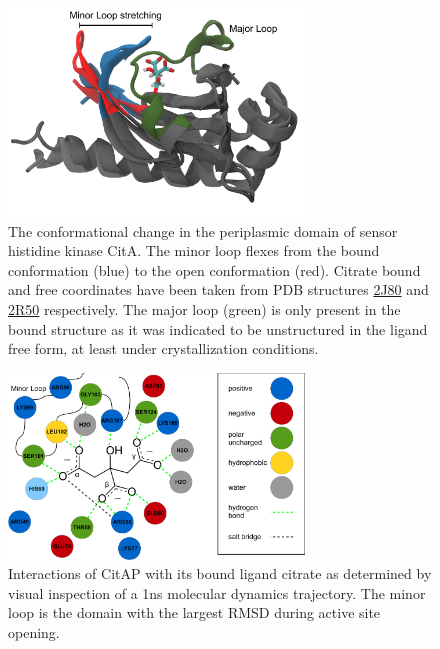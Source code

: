 \documentclass[english, a4paper, 12pt, titlepage, draft]{article}
\newcommand{\PDB}[1]{
    \href{http://pdb.rcsb.org/pdb/explore/explore.do?structureId=#1}{#1}
}
\begin{document}
\begin{figure}
    \centering
    \includegraphics[width=0.7\textwidth]{figures/CitAP_conf_change/CitAP_conf_change.pdf}
    \caption{The conformational change in the periplasmic domain of sensor histidine kinase CitA.
    The minor loop flexes from the bound conformation (blue) to the open conformation (red).
    Citrate bound and free coordinates have been taken from PDB structures \PDB{2J80} and \PDB{2R50} respectively.
    The major loop (green) is only present in the bound structure as it was indicated to be unstructured in the ligand free form, at least under crystallization conditions.}
    \label{fig:CitA_opening}
\end{figure}     



\begin{figure}
    \centering
    \includegraphics[width=0.7\textwidth]{figures/citrate_interactions/citrate_interactions.pdf}
    \caption{Interactions of CitAP with its bound ligand citrate as determined by visual inspection of a 1ns molecular dynamics trajectory. The minor loop is the domain with the largest RMSD during active site opening.}
    \label{fig:citrate_interactions}
\end{figure}      


\end{document}
